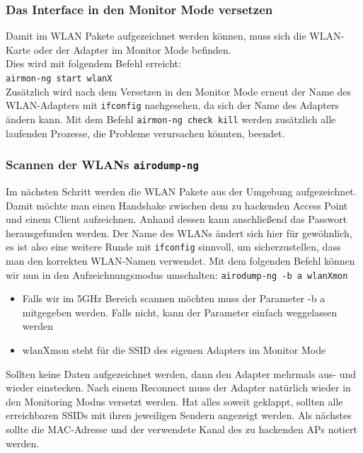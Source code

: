	\subsubsection{Das Interface in den Monitor Mode versetzen}
	Damit im WLAN Pakete aufgezeichnet werden können, muss sich die WLAN-Karte oder der Adapter im Monitor Mode befinden. \\
	Dies wird mit folgendem Befehl erreicht: \\
	\colorbox{altgray}{\lstinline|airmon-ng start wlanX|} \\

	\noindent Zusätzlich wird nach dem Versetzen in den Monitor Mode erneut der Name des WLAN-Adapters mit \colorbox{altgray}{\lstinline|ifconfig|} nachgesehen, da sich der Name des Adapters ändern kann. Mit dem Befehl \colorbox{altgray}{\lstinline|airmon-ng check kill|} werden zusätzlich alle laufenden Prozesse, die Probleme verursachen könnten, beendet.

	\subsubsection{Scannen der WLANs \colorbox{altgray}{\lstinline|airodump-ng|}}
	Im nächsten Schritt werden die WLAN Pakete aus der Umgebung aufgezeichnet. Damit möchte man einen Handshake zwischen dem zu hackenden Access Point und einem Client aufzeichnen. Anhand dessen kann anschließend das Passwort herausgefunden werden. Der Name des WLANs ändert sich hier für gewöhnlich, es ist also eine weitere Runde mit \colorbox{altgray}{\lstinline|ifconfig|} sinnvoll, um sicherzustellen, dass man den korrekten WLAN-Namen verwendet. Mit dem folgenden Befehl können wir nun in den Aufzeichnungsmodus umschalten: \newline
	\colorbox{altgray}{\lstinline|airodump-ng -b a wlanXmon|}\newline
	\begin{itemize}
		\item Falls wir im 5GHz Bereich scannen möchten muss der Parameter -b a mitgegeben werden. Falls nicht, kann der Parameter einfach weggelassen werden
		\item wlanXmon steht für die SSID des eigenen Adapters im Monitor Mode
	\end{itemize}
Sollten keine Daten aufgezeichnet werden, dann den Adapter mehrmals aus- und wieder einstecken. Nach einem Reconnect muss der Adapter natürlich wieder in den Monitoring Modus versetzt werden. Hat alles soweit geklappt, sollten alle erreichbaren SSIDs mit ihren jeweiligen Sendern angezeigt werden. Als nächstes sollte die MAC-Adresse und der verwendete Kanal des zu hackenden APs notiert werden.

